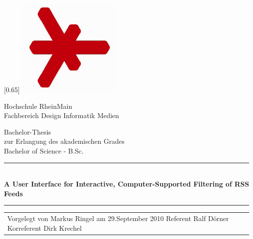 \begin{titlepage}
	\begin{center}
		\begin{minipage}{0.5\textwidth}
			\raggedright
			\scalebox{0.65}[0.65]{
			\includegraphics{Logo_HSRM}}
		\end{minipage}
		\hspace{0.3cm}
		\begin{minipage}{0.6\textwidth}
			\raggedright
			{\LARGE Hochschule RheinMain} \\
			{\Large Fachbereich Design Informatik Medien} \\[0.2cm]
		\end{minipage}
		
		\vfill

		{\LARGE Bachelor-Thesis} \\[0.5cm]
		{\large zur Erlangung des akademischen Grades} \\[0.5cm]
		{\Large Bachelor of Science - B.Sc.}
		
		\rule{\textwidth}{1pt}\\[0.5cm]
		{\huge \bfseries A User Interface for Interactive, Computer-Supported Filtering of RSS Feeds}\\[0.4cm]
		\rule{\textwidth}{1pt}
		
		\vfill
		
		\begin{tabular}{lr}
			Vorgelegt von Markus Ringel
			am 29.September 2010
			Referent  Ralf Dörner
			Korreferent Dirk Krechel
		\end{tabular}
		
		\vfill
		
		
	\end{center}
\end{titlepage}
